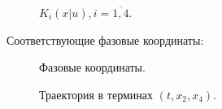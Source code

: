 \documentclass[11pt]{article}
\theoremstyle{definition}
\begin{document}
\begin{figure}[h]
\caption{$K_i(x|u), i = \overline{1,4}$.}
\end{figure}
\FloatBarrier

Соответствующие фазовые координаты:

\begin{figure}[h]
\caption{Фазовые координаты.}
\end{figure}
\FloatBarrier

\begin{figure}[h]
\caption{Траектория в терминах $(t,x_2,x_4)$.}
\end{figure}
\FloatBarrier
\end{document}
